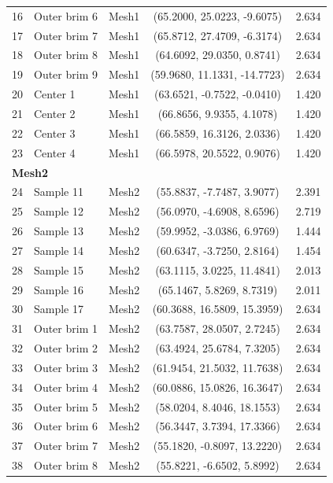 \begin{table}[htbp]
\begin{tabular}{c l c c c}
    16 & Outer brim 6 & Mesh1 & (65.2000, 25.0223, -9.6075) & 2.634 \\
    17 & Outer brim 7 & Mesh1 & (65.8712, 27.4709, -6.3174) & 2.634 \\
    18 & Outer brim 8 & Mesh1 & (64.6092, 29.0350, 0.8741)  & 2.634 \\
    19 & Outer brim 9 & Mesh1 & (59.9680, 11.1331, -14.7723) & 2.634 \\
    20 & Center 1   & Mesh1 & (63.6521, -0.7522, -0.0410) & 1.420 \\
    21 & Center 2   & Mesh1 & (66.8656, 9.9355, 4.1078)   & 1.420 \\
    22 & Center 3   & Mesh1 & (66.5859, 16.3126, 2.0336)  & 1.420 \\
    23 & Center 4   & Mesh1 & (66.5978, 20.5522, 0.9076)  & 1.420 \\
    \midrule
    \multicolumn{5}{l}{\textbf{Mesh2}} \\
    24 & Sample 11  & Mesh2 & (55.8837, -7.7487, 3.9077)  & 2.391 \\
    25 & Sample 12  & Mesh2 & (56.0970, -4.6908, 8.6596)  & 2.719 \\
    26 & Sample 13  & Mesh2 & (59.9952, -3.0386, 6.9769)  & 1.444 \\
    27 & Sample 14  & Mesh2 & (60.6347, -3.7250, 2.8164)  & 1.454 \\
    28 & Sample 15  & Mesh2 & (63.1115, 3.0225, 11.4841)  & 2.013 \\
    29 & Sample 16  & Mesh2 & (65.1467, 5.8269, 8.7319)   & 2.011 \\
    30 & Sample 17  & Mesh2 & (60.3688, 16.5809, 15.3959) & 2.634 \\
    31 & Outer brim 1  & Mesh2 & (63.7587, 28.0507, 2.7245)  & 2.634 \\
    32 & Outer brim 2  & Mesh2 & (63.4924, 25.6784, 7.3205)  & 2.634 \\
    33 & Outer brim 3  & Mesh2 & (61.9454, 21.5032, 11.7638) & 2.634 \\
    34 & Outer brim 4  & Mesh2 & (60.0886, 15.0826, 16.3647) & 2.634 \\
    35 & Outer brim 5  & Mesh2 & (58.0204, 8.4046, 18.1553)  & 2.634 \\
    36 & Outer brim 6  & Mesh2 & (56.3447, 3.7394, 17.3366)  & 2.634 \\
    37 & Outer brim 7  & Mesh2 & (55.1820, -0.8097, 13.2220) & 2.634 \\
    38 & Outer brim 8  & Mesh2 & (55.8221, -6.6502, 5.8992)  & 2.634 \\

\end{tabular}
\end{table}
